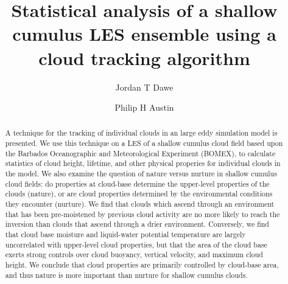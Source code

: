 \documentclass[acp]{copernicus}
\begin{document}
\title{Statistical analysis of a shallow cumulus LES ensemble using a 
cloud tracking algorithm}


\author[1]{Jordan T Dawe}
\author[1]{Philip H Austin}










\received{}
\pubdiscuss{} %
\revised{}
\accepted{}
\published{}




\maketitle



\begin{abstract}
A technique for the tracking of individual clouds in an large eddy 
simulation model is presented.  We use this technique on a LES of a 
shallow cumulus cloud field based upon the Barbados Oceanographic and 
Meteorological Experiment (BOMEX), to calculate statistics of cloud 
height, lifetime, and other physical properies for individual clouds 
in the model.  We also examine the question of nature versus nurture 
in shallow cumulus cloud fields: do properties at cloud-base determine 
the upper-level properties of the clouds (nature), or are cloud properties 
determined by the environmental conditions they encounter (nurture).  
We find that clouds which ascend through an environment that has been 
pre-moistened by previous cloud activity are no more likely to reach 
the inversion than clouds that ascend through a drier environment.  
Conversely, we find that cloud base moisture and liquid-water potential 
temperature are largely uncorrelated with upper-level cloud properties, 
but that the area of the cloud base exerts strong controls over cloud 
buoyancy, vertical velocity, and maximum cloud height.  We conclude 
that cloud properties are primarily controlled by cloud-base area, and thus
nature is more important than nurture for shallow cumulus clouds.
\end{abstract}
\end{document}
